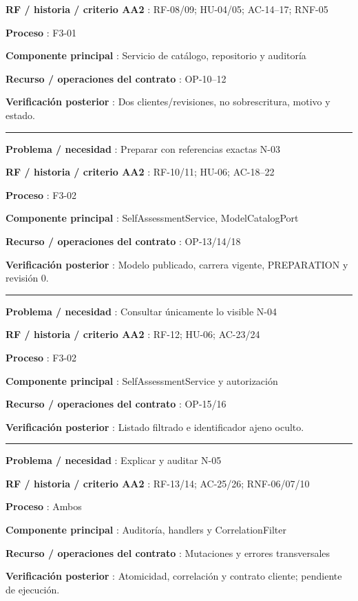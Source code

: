 \documentclass[12pt,a4paper]{report}
\begin{document}
\textbf{RF / historia / criterio AA2 }: RF-08/09; HU-04/05;
AC-14--17; RNF-05

\textbf{Proceso }: F3-01

\textbf{Componente principal }: Servicio de catálogo, repositorio y
auditoría

\textbf{Recurso / operaciones del contrato }: OP-10--12

\textbf{Verificación posterior }: Dos clientes/revisiones, no
sobrescritura, motivo y estado.

\medskip\hrule\medskip

\textbf{Problema / necesidad }: Preparar con referencias exactas N-03

\textbf{RF / historia / criterio AA2 }: RF-10/11; HU-06;
AC-18--22

\textbf{Proceso }: F3-02

\textbf{Componente principal }: SelfAssessmentService, ModelCatalogPort

\textbf{Recurso / operaciones del contrato }: OP-13/14/18

\textbf{Verificación posterior }: Modelo publicado, carrera vigente,
PREPARATION y revisión 0.

\medskip\hrule\medskip

\textbf{Problema / necesidad }: Consultar únicamente lo visible N-04

\textbf{RF / historia / criterio AA2 }: RF-12; HU-06; AC-23/24

\textbf{Proceso }: F3-02

\textbf{Componente principal }: SelfAssessmentService y autorización

\textbf{Recurso / operaciones del contrato }: OP-15/16

\textbf{Verificación posterior }: Listado filtrado e identificador ajeno
oculto.

\medskip\hrule\medskip

\textbf{Problema / necesidad }: Explicar y auditar N-05

\textbf{RF / historia / criterio AA2 }: RF-13/14; AC-25/26;
RNF-06/07/10

\textbf{Proceso }: Ambos

\textbf{Componente principal }: Auditoría, handlers y CorrelationFilter

\textbf{Recurso / operaciones del contrato }: Mutaciones y errores
transversales

\textbf{Verificación posterior }: Atomicidad, correlación y contrato
cliente; pendiente de ejecución.
\end{document}
